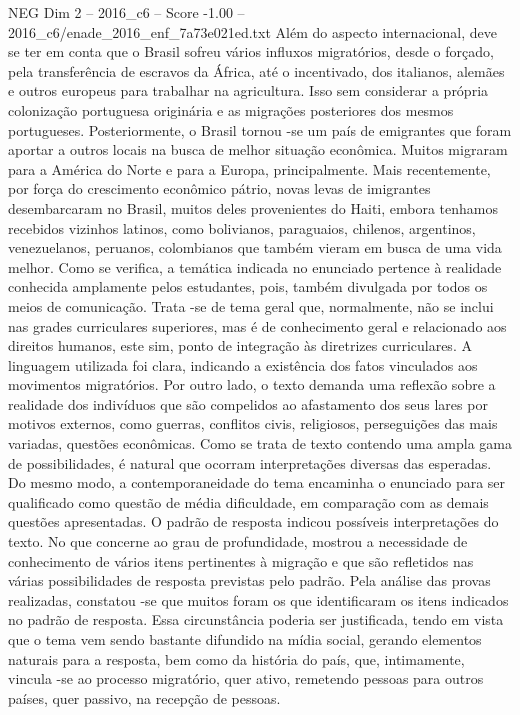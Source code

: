 \begin{textsample}{NEG Dim 2 – 2016\_c6 – Score -1.00 – 2016\_c6/enade\_2016\_enf\_7a73e021ed.txt}
Além do aspecto internacional, deve se ter em conta que o Brasil sofreu vários influxos migratórios, desde o forçado, pela transferência de escravos da África, até o incentivado, dos italianos, alemães e outros europeus para trabalhar na agricultura.
Isso sem considerar a própria colonização portuguesa originária e as migrações posteriores dos mesmos portugueses.
Posteriormente, o Brasil tornou -se um país de emigrantes que foram aportar a outros locais na busca de melhor situação econômica.
Muitos migraram para a América do Norte e para a Europa, principalmente.
Mais recentemente, por força do crescimento econômico pátrio, novas levas de imigrantes desembarcaram no Brasil, muitos deles provenientes do Haiti, embora tenhamos recebidos vizinhos latinos, como bolivianos, paraguaios, chilenos, argentinos, venezuelanos, peruanos, colombianos que também vieram em busca de uma vida melhor.
Como se verifica, a temática indicada no enunciado pertence à realidade conhecida amplamente pelos estudantes, pois, também divulgada por todos os meios de comunicação.
Trata -se de tema geral que, normalmente, não se inclui nas grades curriculares superiores, mas é de conhecimento geral e relacionado aos direitos humanos, este sim, ponto de integração às diretrizes curriculares.
A linguagem utilizada foi clara, indicando a existência dos fatos vinculados aos movimentos migratórios.
Por outro lado, o texto demanda uma reflexão sobre a realidade dos indivíduos que são compelidos ao afastamento dos seus lares por motivos externos, como guerras, conflitos civis, religiosos, perseguições das mais variadas, questões econômicas.
Como se trata de texto contendo uma ampla gama de possibilidades, é natural que ocorram interpretações diversas das esperadas.
Do mesmo modo, a contemporaneidade do tema encaminha o enunciado para ser qualificado como questão de média dificuldade, em comparação com as demais questões apresentadas.
O padrão de resposta indicou possíveis interpretações do texto.
No que concerne ao grau de profundidade, mostrou a necessidade de conhecimento de vários itens pertinentes à migração e que são refletidos nas várias possibilidades de resposta previstas pelo padrão.
Pela análise das provas realizadas, constatou -se que muitos foram os que identificaram os itens indicados no padrão de resposta.
Essa circunstância poderia ser justificada, tendo em vista que o tema vem sendo bastante difundido na mídia social, gerando elementos naturais para a resposta, bem como da história do país, que, intimamente, vincula -se ao processo migratório, quer ativo, remetendo pessoas para outros países, quer passivo, na recepção de pessoas.

\end{textsample}
